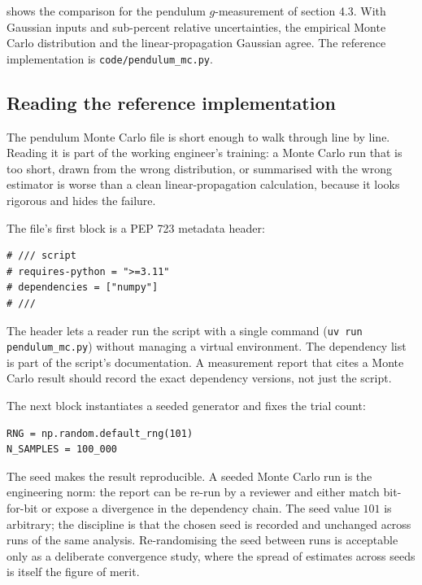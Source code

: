 

 shows the comparison for the
pendulum $g$-measurement of section 4.3. With Gaussian inputs and
sub-percent relative uncertainties, the empirical Monte Carlo
distribution and the linear-propagation Gaussian agree. The
reference implementation is \texttt{code/pendulum\_mc.py}.

\subsection{Reading the reference implementation}

The pendulum Monte Carlo file is short enough to walk through line
by line. Reading it is part of the working engineer's training: a
Monte Carlo run that is too short, drawn from the wrong
distribution, or summarised with the wrong estimator is worse than a
clean linear-propagation calculation, because it looks rigorous and
hides the failure.

The file's first block is a PEP 723 metadata header:

\begin{verbatim}
# /// script
# requires-python = ">=3.11"
# dependencies = ["numpy"]
# ///
\end{verbatim}

The header lets a reader run the script with a single command
(\texttt{uv run pendulum\_mc.py}) without managing a virtual
environment. The dependency list is part of the script's
documentation. A measurement report that cites a Monte Carlo result
should record the exact dependency versions, not just the script.

The next block instantiates a seeded generator and fixes the trial
count:

\begin{verbatim}
RNG = np.random.default_rng(101)
N_SAMPLES = 100_000
\end{verbatim}

The seed makes the result reproducible. A seeded Monte Carlo run is
the engineering norm: the report can be re-run by a reviewer and
either match bit-for-bit or expose a divergence in the dependency
chain. The seed value $101$ is arbitrary; the discipline is that the
chosen seed is recorded and unchanged across runs of the same
analysis. Re-randomising the seed between runs is acceptable only as
a deliberate convergence study, where the spread of estimates across
seeds is itself the figure of merit.


